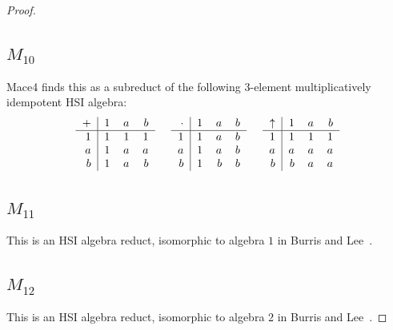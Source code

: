 \documentclass[eqnor,reqno]{amsart}
\theoremstyle{plain}
\theoremstyle{definition}
\begin{document}
\begin{proof}
\subsection{$M_{10}$}  Mace4 finds this as a subreduct of the following $3$-element multiplicatively idempotent HSI algebra:
\[
\begin{tabular}{r|rrr}
$+$ & $1$ & $a$ & $b$\\
\hline
    $1$ & $1$ & $1$ & $1$ \\
    $a$ & $1$ & $a$ & $a$ \\
    $b$ & $1$ & $a$ & $b$
\end{tabular} \hspace{.5cm}
\begin{tabular}{r|rrr}
$\cdot$ & $1$ & $a$ & $b$\\
\hline
    $1$ & $1$ & $a$ & $b$ \\
    $a$ & $1$ & $a$ & $b$ \\
    $b$ & $1$ & $b$ & $b$
\end{tabular} \hspace{.5cm}
\begin{tabular}{r|rrr}
$\uparrow$ & $1$ & $a$ & $b$\\
\hline
    $1$ & $1$ & $1$ & $1$ \\
    $a$ & $a$ & $a$ & $a$ \\
    $b$ & $b$ & $a$ & $a$
\end{tabular}
\]


\subsection{$M_{11}$}  This is an HSI algebra reduct, isomorphic to algebra $1$ in Burris and Lee~\cite[Theorem~4.1]{burlee92}.

\subsection{$M_{12}$}  This is an HSI algebra reduct, isomorphic to algebra $2$ in Burris and Lee~\cite[Theorem~4.1]{burlee92}. 


\end{proof}
\end{document}
